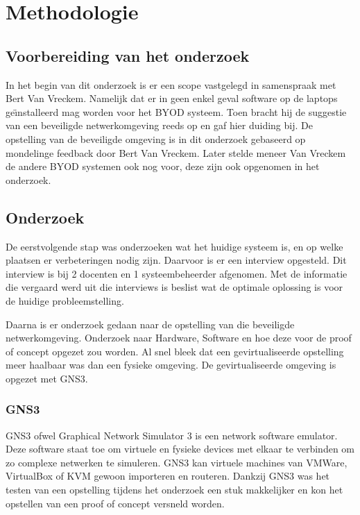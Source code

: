 
\chapter{Methodologie}
\label{ch:methodologie}



\section{Voorbereiding van het onderzoek}
In het begin van dit onderzoek is er een scope vastgelegd in samenspraak met Bert Van Vreckem. Namelijk dat er in geen enkel geval software op de laptops ge\"{\i}nstalleerd mag worden voor het BYOD systeem. Toen bracht hij de suggestie van een beveiligde netwerkomgeving reeds op en gaf hier duiding bij. De opstelling van de beveiligde omgeving is in dit onderzoek gebaseerd op mondelinge feedback door Bert Van Vreckem. Later stelde meneer Van Vreckem de andere BYOD systemen ook nog voor, deze zijn ook opgenomen in het onderzoek.

\section{Onderzoek}


De eerstvolgende stap was onderzoeken wat het huidige systeem is, en op welke plaatsen er verbeteringen nodig zijn. Daarvoor is er een interview opgesteld. Dit interview is bij 2 docenten en 1  systeembeheerder afgenomen. Met de informatie die vergaard werd uit die interviews is beslist wat de optimale oplossing is voor de huidige probleemstelling.

Daarna is er onderzoek gedaan naar de opstelling van die beveiligde netwerkomgeving. Onderzoek naar Hardware, Software en hoe deze voor de proof of concept opgezet zou worden. Al snel bleek dat een gevirtualiseerde opstelling meer haalbaar was dan een fysieke omgeving. De gevirtualiseerde omgeving is opgezet met GNS3. 

\subsection{GNS3}
GNS3 ofwel Graphical Network Simulator 3 is een network software emulator. Deze software staat toe om virtuele en fysieke devices met elkaar te verbinden om zo complexe netwerken te simuleren. GNS3 kan virtuele machines van VMWare, VirtualBox of KVM gewoon importeren en routeren. Dankzij GNS3 was het testen van een opstelling tijdens het onderzoek een stuk makkelijker en kon het opstellen van een proof of concept versneld worden.

